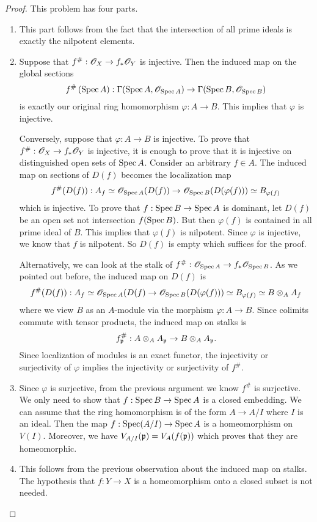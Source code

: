 \documentclass[]{pcmi}
\theoremstyle{plain}
\theoremstyle{definition}
\theoremstyle{remark}
\begin{document}
\begin{proof}
    This problem has four parts. 
    \begin{enumerate}[label = (\alph*)]
        \item This part follows from the fact that the intersection of all prime ideals is exactly the nilpotent elements. 

        \item Suppose that $f^{\#} : \mathscr{O}_X \to f_* \mathscr{O}_Y$ is injective. Then the induced map on the global sections
        \[
            f^{\#} \left( \operatorname{Spec} A \right) : \Gamma(\operatorname{Spec} A, \mathscr{O}_{\operatorname{Spec} A}) \to \Gamma(\operatorname{Spec} B, \mathscr{O}_{\operatorname{Spec} B})
        \]
        is exactly our original ring homomorphism $\varphi : A \to B$. This implies that $\varphi$ is injective. 
        
        Conversely, suppose that $\varphi : A \to B$ is injective. To prove that $f^{\#} : \mathscr{O}_X \to f_* \mathscr{O}_Y$ is injective, it is enough to prove that it is injective on distinguished open sets of $\operatorname{Spec} A$. Consider an arbitrary $f \in A$. The induced map on sections of $D(f)$ becomes the localization map
        \[
            f^{\#}(D(f)) : A_f \simeq \mathscr{O}_{\operatorname{Spec} A}(D(f)) \to \mathscr{O}_{\operatorname{Spec} B}(D(\varphi(f))) \simeq B_{\varphi(f)}
        \]
        which is injective. To prove that $f : \operatorname{Spec} B \to \operatorname{Spec} A$ is dominant, let $D(f)$ be an open set not intersection $f(\operatorname{Spec} B)$. But then $\varphi(f)$ is contained in all prime ideal of $B$. This implies that $\varphi (f)$ is nilpotent. Since $\varphi$ is injective, we know that $f$ is nilpotent. So $D(f)$ is empty which suffices for the proof. 

        Alternatively, we can look at the stalk of $f^\# : \mathscr{O}_{\operatorname{Spec} A} \to f_* \mathscr{O}_{\operatorname{Spec} B}$. As we pointed out before, the induced map on $D(f)$ is 
        \[
            f^{\#}(D(f)) : A_f \simeq \mathscr{O}_{\operatorname{Spec} A}{(D(f)} \to \mathscr{O}_{\operatorname{Spec} B}(D(\varphi(f))) \simeq B_{\varphi(f)} \simeq B \otimes_A A_f
        \]
        where we view $B$ as an $A$-module via the morphism $\varphi : A \to B$. Since colimits commute with tensor products, the induced map on stalks is 
        \[
            f^{\#}_{\mathfrak{p}} : A \otimes_A A_{\mathfrak{p}} \to B \otimes_A A_{\mathfrak{p}}. 
        \] 
        Since localization of modules is an exact functor, the injectivity or surjectivity of $\varphi$ implies the injectivity or surjectivity of $f^\#$. 

        \item Since $\varphi$ is surjective, from the previous argument we know $f^{\#}$ is surjective. We only need to show that $f : \operatorname{Spec} B \to \operatorname{Spec} A$ is a closed embedding. We can assume that the ring homomorphism is of the form $A \to A/I$ where $I$ is an ideal. Then the map $f: \operatorname{Spec} (A/I) \to \operatorname{Spec} A$ is a homeomorphism on $V(I)$. Moreover, we have $V_{A/I}(\mathfrak{p}) = V_A(f(\mathfrak{p}))$ which proves that they are homeomorphic. 
        
        \item This follows from the previous observation about the induced map on stalks. The hypothesis that $f : Y \to X$ is a homeomorphism onto a closed subset is not needed. 
    \end{enumerate}
\end{proof}
\end{document}
